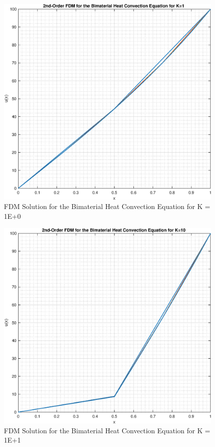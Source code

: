 \documentclass[10pt]{article}
\begin{document}
\begin{figure}[H]
	\begin{center}
		\includegraphics[width=0.6\linewidth]{solution_K_1}
		\caption{FDM Solution for the Bimaterial Heat Convection Equation for K = 1E+0}
	\end{center}
\end{figure}
\vfill
\begin{figure}[H]
	\begin{center}
		\includegraphics[width=0.6\linewidth]{solution_K_10}
		\caption{FDM Solution for the Bimaterial Heat Convection Equation for K = 1E+1}
	\end{center}
\end{figure}
\end{document}
